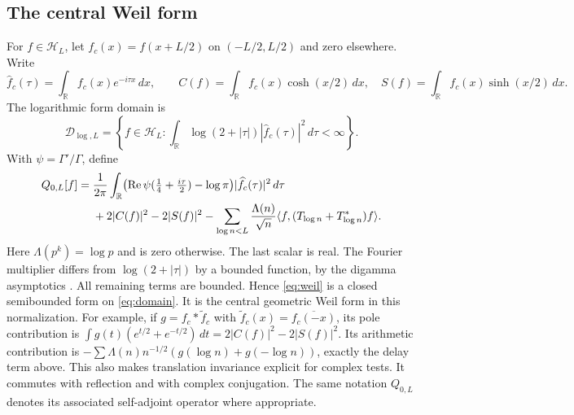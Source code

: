 \documentclass[11pt]{article}
\numberwithin{equation}{section}
\theoremstyle{definition}
\theoremstyle{remark}
\newcommand{\HH}{\mathcal H}
\newcommand{\DD}{\mathcal D}
\newcommand{\RR}{\mathbb R}
\newcommand{\Rea}{\operatorname{Re}}
\newcommand{\ip}[2]{\langle#1,#2\rangle}
\begin{document}
\subsection{The central Weil form}

For $f\in\HH_L$, let $f_c(x)=f(x+L/2)$ on $(-L/2,L/2)$ and zero elsewhere.
Write
\[
 \widehat f_c(\tau)=\int_{\RR}f_c(x)e^{-i\tau x}\,dx,\qquad
 C(f)=\int_{\RR}f_c(x)\cosh(x/2)\,dx,\quad
 S(f)=\int_{\RR}f_c(x)\sinh(x/2)\,dx.
\]
The logarithmic form domain is
\begin{equation}\label{eq:domain}
 \DD_{\log,L}=\left\{f\in\HH_L:
 \int_{\RR}\log(2+|\tau|)|\widehat f_c(\tau)|^2\,d\tau<\infty\right\}.
\end{equation}
With $\psi=\Gamma'/\Gamma$, define
\begin{align}
 Q_{0,L}[f]={}&\frac1{2\pi}\int_{\RR}
 \bigl(\Rea\psi(\tfrac14+\tfrac{i\tau}{2})-\log\pi\bigr)
 |\widehat f_c(\tau)|^2\,d\tau\notag\\
 &+2|C(f)|^2-2|S(f)|^2
 -\sum_{\log n<L}\frac{\Lambda(n)}{\sqrt n}
 \ip f{(T_{\log n}+T_{\log n}^*)f}.
 \label{eq:weil}
\end{align}
Here $\Lambda(p^k)=\log p$ and is zero otherwise. The last scalar is real.
The Fourier multiplier differs from $\log(2+|\tau|)$ by a bounded function,
by the digamma asymptotics \cite[\S5.11]{DLMF}. All remaining terms are
bounded. Hence \eqref{eq:weil} is a closed semibounded form on
\eqref{eq:domain}. It is the central geometric Weil form in this normalization.
For example, if $g=f_c*\widetilde f_c$ with
$\widetilde f_c(x)=\overline{f_c(-x)}$, its pole contribution is
$\int g(t)(e^{t/2}+e^{-t/2})\,dt=2|C(f)|^2-2|S(f)|^2$.
Its arithmetic contribution is
$-\sum\Lambda(n)n^{-1/2}(g(\log n)+g(-\log n))$, exactly the delay term
above. This also makes translation invariance explicit for complex tests.
It commutes with reflection and with complex conjugation. The same notation
$Q_{0,L}$ denotes its associated self-adjoint operator where appropriate.
\end{document}
